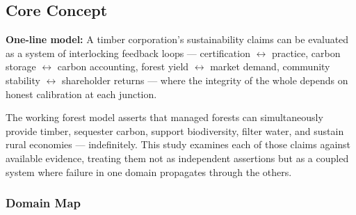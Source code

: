 \documentclass[11pt,letterpaper]{article}
\begin{document}
\subsection{Core Concept}

\begin{quotebox}
\textbf{One-line model:} A timber corporation's sustainability claims can be evaluated as a system of interlocking feedback loops --- certification $\leftrightarrow$ practice, carbon storage $\leftrightarrow$ carbon accounting, forest yield $\leftrightarrow$ market demand, community stability $\leftrightarrow$ shareholder returns --- where the integrity of the whole depends on honest calibration at each junction.
\end{quotebox}

The working forest model asserts that managed forests can simultaneously provide timber, sequester carbon, support biodiversity, filter water, and sustain rural economies --- indefinitely. This study examines each of those claims against available evidence, treating them not as independent assertions but as a coupled system where failure in one domain propagates through the others.

\subsubsection{Domain Map}
\end{document}
